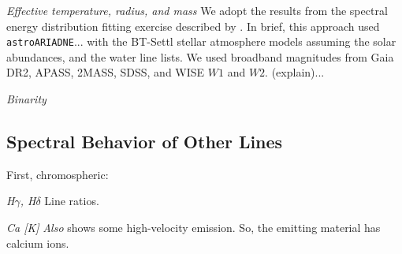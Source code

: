 \documentclass{nature3}
\begin{document}
\begin{methods}
{\it Effective temperature, radius, and mass}
We adopt the results from the spectral energy distribution fitting
exercise described by \cite{Bouma2024}.
In brief, this approach used
\texttt{astroARIADNE}...
\cite{Vines2022} with the BT-Settl stellar
atmosphere models \cite{Allard2012} assuming the
\cite{Asplund2009} solar abundances, and the
\cite{Barber2006} water line lists.  
We used broadband magnitudes from Gaia DR2, APASS, 2MASS, SDSS, and WISE
  $W1$ and $W2$.  (explain)...




{\it Binarity}

\subsection{Spectral Behavior of Other Lines}

First, chromospheric:

{\it H$\gamma$, H$\delta$}
Line ratios.

{\it Ca [K]}
{\it Also} shows some high-velocity emission.  So, the emitting material has
calcium ions.


\end{methods}
\end{document}
